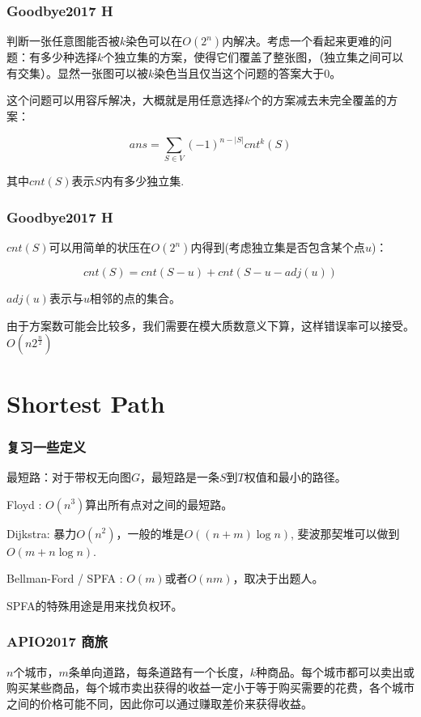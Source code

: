 \documentclass[10pt]{beamer}
\begin{document}
\begin{CJK}{UTF8}{gkai}
\begin{spacing}{1.1}
\begin{frame}
\frametitle{Goodbye2017 H}

	判断一张任意图能否被$k$染色可以在$O(2^n)$内解决。考虑一个看起来更难的问题：有多少种选择$k$个独立集的方案，使得它们覆盖了整张图，（独立集之间可以有交集）。显然一张图可以被$k$染色当且仅当这个问题的答案大于0。\pause

	这个问题可以用容斥解决，大概就是用任意选择$k$个的方案减去未完全覆盖的方案：

	$$ans = \sum_{S \in V} (-1)^{n - |S|} cnt^k(S)$$

	其中$cnt(S)$表示$S$内有多少独立集.
	
\end{frame}

\begin{frame}
\frametitle{Goodbye2017 H}

	$cnt(S)$可以用简单的状压在$O(2^n)$内得到(考虑独立集是否包含某个点$u$)：

	$$cnt(S) = cnt(S - {u}) + cnt(S - {u} - adj(u))$$

	$adj(u)$表示与$u$相邻的点的集合。\pause

	由于方案数可能会比较多，我们需要在模大质数意义下算，这样错误率可以接受。$O(n2^{\frac n2})$
\end{frame}

\section{Shortest Path}

\begin{frame}
\frametitle{复习一些定义}

	最短路：对于带权无向图$G$，最短路是一条$S$到$T$权值和最小的路径。\pause

	Floyd : $O(n^3)$算出所有点对之间的最短路。\pause
	
	Dijkstra: 暴力$O(n^2)$，一般的堆是$O((n + m) \log n)$, 斐波那契堆可以做到$O(m + n \log n)$. \pause

	Bellman-Ford / SPFA : $O(m)$或者$O(nm)$，取决于出题人。\pause
	
	SPFA的特殊用途是用来找负权环。

\end{frame}

\begin{frame}
\frametitle{APIO2017 商旅}
	$n$个城市，$m$条单向道路，每条道路有一个长度，$k$种商品。每个城市都可以卖出或购买某些商品，每个城市卖出获得的收益一定小于等于购买需要的花费，各个城市之间的价格可能不同，因此你可以通过赚取差价来获得收益。


\end{frame}
\end{spacing}
\end{CJK}
\end{document}
